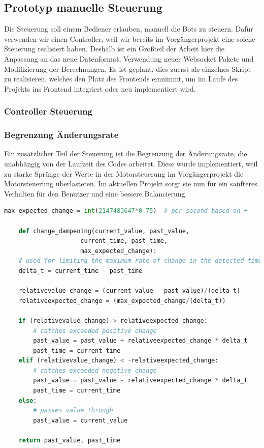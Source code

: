 \subsection{Prototyp manuelle Steuerung}
Die Steuerung soll einem Bediener erlauben, manuell die Bots zu steuern. 
% 
Dafür verwenden wir einen Controller, 
weil wir bereits im Vorgängerprojekt
eine solche Steuerung realisiert haben. 
Deshalb ist ein Großteil der Arbeit hier die Anpassung an das neue Datenformat, 
Verwendung neuer Websocket Pakete und Modifizierung der Berechnungen.
% 
Es ist geplant, dies zuerst als einzelnes Skript zu realisieren, 
welches den Platz des Frontends einnimmt, 
um im Laufe des Projekts ins Frontend integriert oder neu implementiert wird.

\subsubsection{Controller Steuerung}

\subsubsection{Begrenzung Änderungsrate}
Ein zusätzlicher Teil der Steuerung ist die Begrenzung der Änderungsrate, 
die unabhängig von der Laufzeit des Codes arbeitet.
% 
Diese wurde implementiert, weil zu starke Sprünge der Werte in der Motorsteuerung 
im Vorgängerprojekt die Motorsteuerung überlasteten.
% 
Im aktuellen Projekt sorgt sie nun für ein sanfteres Verhalten für den Benutzer 
und eine bessere Balancierung.
\begin{lstlisting}[language=python, gobble=4]
    max_expected_change = int(2147483647*0.75)  # per second based on +-

    def change_dampening(current_value, past_value,
                     current_time, past_time,
                     max_expected_change):
    # used for limiting the maximum rate of change in the detected time window
    delta_t = current_time - past_time

    relativevalue_change = (current_value - past_value)/(delta_t)
    relativeexpected_change = (max_expected_change/(delta_t))

    if (relativevalue_change) > relativeexpected_change:
        # catches exceeded positive change
        past_value = past_value + relativeexpected_change * delta_t
        past_time = current_time
    elif (relativevalue_change) < -relativeexpected_change:
        # catches exceeded negative change
        past_value = past_value - relativeexpected_change * delta_t
        past_time = current_time
    else:
        # passes value through
        past_value = current_value

    return past_value, past_time
\end{lstlisting}

